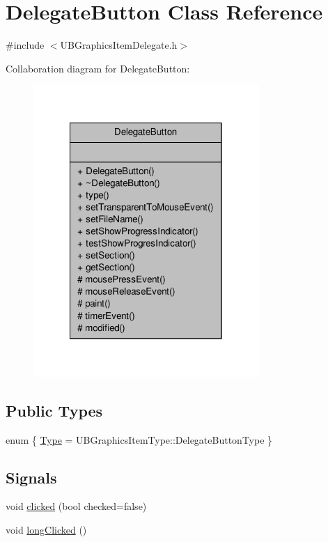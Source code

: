 \hypertarget{class_delegate_button}{\section{Delegate\-Button Class Reference}
\label{da/dec/class_delegate_button}
}


{\ttfamily \#include $<$U\-B\-Graphics\-Item\-Delegate.\-h$>$}



Collaboration diagram for Delegate\-Button\-:
\nopagebreak
\begin{figure}[H]
\begin{center}
\leavevmode
\includegraphics[width=242pt]{d8/d6e/class_delegate_button__coll__graph}
\end{center}
\end{figure}
\subsection*{Public Types}
\begin{DoxyCompactItemize}
\item 
enum \{ \hyperlink{class_delegate_button_ab4438170fda06b763ac045f9f467210ea4adf62e8b06f737a9a395b588e62850d}{Type} =  U\-B\-Graphics\-Item\-Type\-:\-:Delegate\-Button\-Type
 \}
\end{DoxyCompactItemize}
\subsection*{Signals}
\begin{DoxyCompactItemize}
\item 
void \hyperlink{class_delegate_button_ad4823c632f1e03c024d1796919bb1ba9}{clicked} (bool checked=false)
\item 
void \hyperlink{class_delegate_button_a13772a108dd6f6ed279b4ae705d69099}{long\-Clicked} ()
\end{DoxyCompactItemize}
